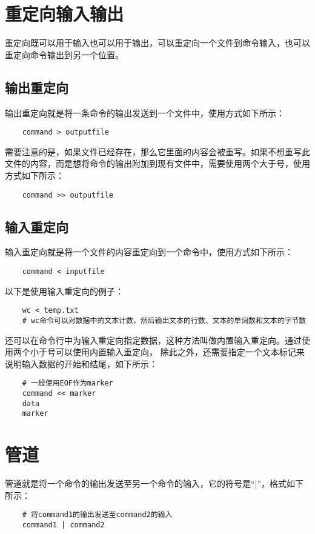 \documentclass[a4paper,left=1.5cm,right=1.5cm,11pt]{article}
\begin{document}
\section{重定向输入输出}
	重定向既可以用于输入也可以用于输出，可以重定向一个文件到命令输入，也可以重定向命令输出到另一个位置。

\subsection{输出重定向}
	输出重定向就是将一条命令的输出发送到一个文件中，使用方式如下所示：
	\begin{lstlisting}
	command > outputfile
	\end{lstlisting}

	需要注意的是，如果文件已经存在，那么它里面的内容会被重写。如果不想重写此文件的内容，而是想将命令的输出附加到现有文件中，需要使用两个大于号，使用方式如下所示：
	\begin{lstlisting}
	command >> outputfile
	\end{lstlisting}

\subsection{输入重定向}
	输入重定向就是将一个文件的内容重定向到一个命令中，使用方式如下所示：
	\begin{lstlisting}
	command < inputfile
	\end{lstlisting}

	以下是使用输入重定向的例子：
	\begin{lstlisting}
	wc < temp.txt
	# wc命令可以对数据中的文本计数，然后输出文本的行数、文本的单词数和文本的字节数
	\end{lstlisting}

	还可以在命令行中为输入重定向指定数据，这种方法叫做内置输入重定向。通过使用两个小于号可以使用内置输入重定向，
	除此之外，还需要指定一个文本标记来说明输入数据的开始和结尾，如下所示：
	\begin{lstlisting}
	# 一般使用EOF作为marker
	command << marker
	data
	marker
	\end{lstlisting}

\section{管道}
	管道就是将一个命令的输出发送至另一个命令的输入，它的符号是“|”，格式如下所示：
	\begin{lstlisting}
	# 将command1的输出发送至command2的输入
	command1 | command2
	\end{lstlisting}
\end{document}

